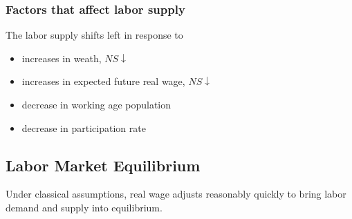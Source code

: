 \subsubsection{Factors that affect labor supply}
\begin{remark}
The labor supply shifts left in response to 
\begin{itemize}
    \item increases in weath, $NS \downarrow$
    \item increases in expected future real wage, $NS \downarrow$
    \item decrease in working age population
    \item decrease in participation rate
\end{itemize} 

\begin{center}
\end{center}
\end{remark}

\subsection{Labor Market Equilibrium}

Under classical assumptions, real wage adjusts reasonably quickly to bring labor demand and supply into equilibrium.



